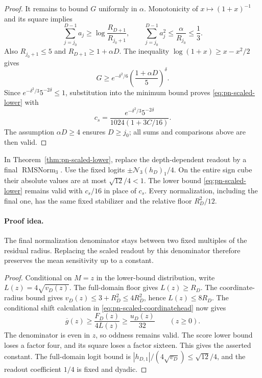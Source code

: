 \begin{proof}
It remains to bound $G$ uniformly in $\alpha$. Monotonicity of
$x\mapsto(1+x)^{-1}$ and its square implies
\[
 \sum_{j=j_0}^{D-1}a_j
 \ge\log\frac{R_{D+1}}{R_{j_0+1}},\qquad
 \sum_{j=j_0}^{D-1}a_j^2
 \le\frac{\alpha}{R_{j_0}}\le\frac13.
\]
Also $R_{j_0+1}\le5$ and $R_{D+1}\ge1+\alpha D$.
The inequality $\log(1+x)\ge x-x^2/2$ gives
\[
 G\ge e^{-\delta^2/6}
       \left(\frac{1+\alpha D}{5}\right)^\delta.
\]
Since $e^{-\delta^2/3}5^{-2\delta}\le1$, substitution into the
minimum bound proves \eqref{eq:pn-scaled-lower} with
\[
 c_s=\frac{e^{-\delta^2/3}5^{-2\delta}}
              {1024(1+3C/16)}.
\]
The assumption
$\alpha D\ge4$ ensures $D\ge j_0$; all sums and comparisons above
are then valid.
\end{proof}


\begin{corollary}
\label{cor:pn-scaled-finalnorm-lower}
In Theorem~\ref{thm:pn-scaled-lower}, replace the depth-dependent readout
by a final $\operatorname{RMSNorm}_3$. Use the fixed logits
$\pm\mathcal N_3(h_D)_1/4$. On the entire sign cube their absolute
values are at most $\sqrt{12}/4<1$. The lower bound
\eqref{eq:pn-scaled-lower} remains valid with $c_s/16$ in place
of $c_s$. Every normalization, including the final one,
has the same fixed stabilizer and the relative floor $R_D^2/12$.
\end{corollary}
\paragraph{Proof idea.}
The final normalization denominator stays between two fixed
multiples of the residual radius. Replacing the scaled readout by this
denominator therefore preserves the mean sensitivity up to a constant.

\begin{proof}
Conditional on $M=z$ in the lower-bound distribution, write
$L(z)=4\sqrt{v_D(z)}$. The full-domain floor gives $L(z)\ge R_D$.
The coordinate-radius bound gives $v_D(z)\le3+R_D^2\le4R_D^2$, hence
$L(z)\le8R_D$. The conditional shift calculation in
\eqref{eq:pn-scaled-coordinatehead} now gives
\[
 \overline g(z)\ge\frac{F_D(z)}{4L(z)}\ge\frac{u_D(z)}{32}
 \qquad(z\ge0).
\]
The denominator is even in $z$, so oddness remains valid. The score
lower bound loses a factor four, and its square loses a factor sixteen.
This gives the asserted constant. The full-domain logit bound is
$|h_{D,1}|/(4\sqrt{v_D})\le\sqrt{12}/4$, and the readout coefficient
$1/4$ is fixed and dyadic.
\end{proof}

